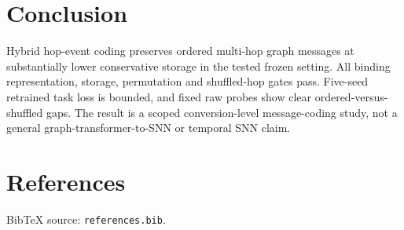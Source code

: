\documentclass{article}
\begin{document}
\section{Conclusion}


Hybrid hop-event coding preserves ordered multi-hop graph messages at substantially lower conservative storage in the tested frozen setting. All binding representation, storage, permutation and shuffled-hop gates pass. Five-seed retrained task loss is bounded, and fixed raw probes show clear ordered-versus-shuffled gaps. The result is a scoped conversion-level message-coding study, not a general graph-transformer-to-SNN or temporal SNN claim.

\section*{References}


BibTeX source: \texttt{references.bib}.



\end{document}
